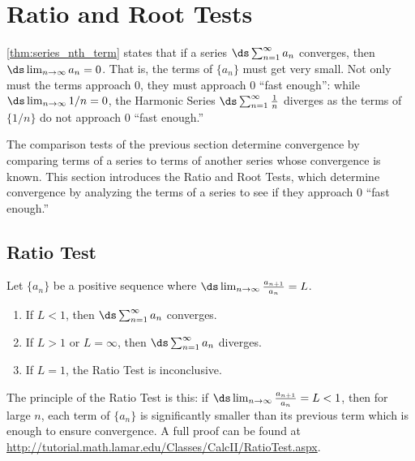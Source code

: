 \section{Ratio and Root Tests}\label{sec:ratio_root_tests}

\autoref{thm:series_nth_term} states that if a series $\ds\sum_{n=1}^\infty a_n$ converges, then $\ds \lim_{n\to \infty} a_n =0$. That is, the terms of $\{a_n\}$ must get very small. Not only must the terms approach 0, they must approach 0 ``fast enough'': while $\ds \lim_{n\to\infty}1/n=0$, the Harmonic Series $\ds\sum_{n=1}^\infty \frac1n$ diverges as the terms of $\{1/n\}$ do not approach 0 ``fast enough.''

The comparison tests of the previous section determine convergence by comparing terms of a series to terms of another series whose convergence is known. This section introduces the Ratio and Root Tests, which determine convergence by analyzing the terms of a series to see if they approach 0 ``fast enough.''

\subsection*{Ratio Test}

{Let $\{a_n\}$ be a positive sequence where $\ds \lim_{n\to\infty}\frac{a_{n+1}}{a_n} = L$.
\begin{enumerate}
	\item If $L<1$, then $\ds\sum_{n=1}^\infty a_n$ converges.
	\item	If $L>1$ or $L=\infty$, then $\ds\sum_{n=1}^\infty a_n$ diverges.
	\item If $L=1$, the Ratio Test is inconclusive.
\end{enumerate}}


The principle of the Ratio Test is this: if $\ds\lim_{n\to\infty}\frac{a_{n+1}}{a_n} = L<1$, then for large $n$, each term of $\{a_n\}$ is significantly smaller than its previous term which is enough to ensure convergence.  A full proof can be found at \url{http://tutorial.math.lamar.edu/Classes/CalcII/RatioTest.aspx}.

